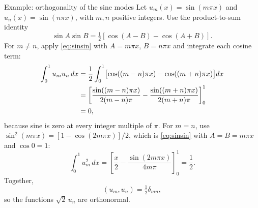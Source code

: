 \documentclass[11pt]{beamer}
\begin{document}
\begin{frame}[allowframebreaks=1.00]{Example: orthogonality of the sine modes}
\footnotesize
Let $u_m(x)=\sin(m\pi x)$ and $u_n(x)=\sin(n\pi x)$, with $m,n$ positive integers.
Use the product-to-sum identity
\begin{equation}
 \sin A\sin B=\tfrac12[\cos(A-B)-\cos(A+B)].\label{eq:sinsin}
\end{equation}
For $m\ne n$, apply \eqref{eq:sinsin} with $A=m\pi x$, $B=n\pi x$ and integrate
each cosine term:
\begin{align}
 \int_0^1u_mu_n\,dx
 &=\frac12\int_0^1\bigl[\cos((m-n)\pi x)-\cos((m+n)\pi x)\bigr]dx\notag\\
 &=\left[\frac{\sin((m-n)\pi x)}{2(m-n)\pi}
        -\frac{\sin((m+n)\pi x)}{2(m+n)\pi}\right]_0^1\notag\\
 &=0,\label{eq:sin-mn}
\end{align}
because sine is zero at every integer multiple of $\pi$.
For $m=n$, use $\sin^2(m\pi x)=[1-\cos(2m\pi x)]/2$, which is \eqref{eq:sinsin} with $A=B=m\pi x$ and $\cos 0=1$:
\begin{equation}
 \int_0^1u_m^2\,dx
 =\left[\frac{x}{2}-\frac{\sin(2m\pi x)}{4m\pi}\right]_0^1
 =\frac12.\label{eq:sin-nn}
\end{equation}
Together,
\begin{equation}
 (u_m,u_n)=\tfrac12\delta_{mn},\label{eq:sin-orth}
\end{equation}
so the functions $\sqrt2\,u_n$ are orthonormal.
\end{frame}
\end{document}
